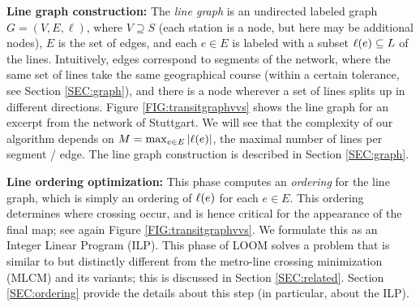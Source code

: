 \documentclass{llncs}
\begin{document}



\smallskip\noindent
{\bf Line graph construction:}
The \emph{line graph} is an undirected labeled graph $G = (V, E, \ell)$, where $V \supseteq S$ (each station is a node, but here may be additional nodes), $E$ is the set of edges, and each $e \in E$ is labeled with a subset $\ell(e) \subseteq L$ of the lines.
Intuitively, edges correspond to segments of the network, where the same set of lines take the same geographical course (within a certain tolerance, see Section \ref{SEC:graph}), and there is a node wherever a set of lines splits up in different directions.
Figure \ref{FIG:transitgraphvvs} shows the line graph for an excerpt from the network of Stuttgart.
We will see that the complexity of our algorithm depends on $M = \max_{e \in E} |\ell(e)|$, the maximal number of lines per segment / edge.
The line graph construction is described in Section \ref{SEC:graph}.

\smallskip\noindent
{\bf Line ordering optimization:} 
This phase computes an \emph{ordering} for the line graph, which is simply an ordering of $\ell(e)$ for each $e \in E$.
This ordering determines where crossing occur, and is hence critical for the appearance of the final map; see again Figure \ref{FIG:transitgraphvvs}.
We formulate this as an Integer Linear Program (ILP).
This phase of LOOM solves a problem that is similar to but distinctly different from the metro-line crossing minimization (MLCM) \cite{bek07} and its variants; this is discussed in Section \ref{SEC:related}.
Section \ref{SEC:ordering} provide the details about this step (in particular, about the ILP).
\end{document}
